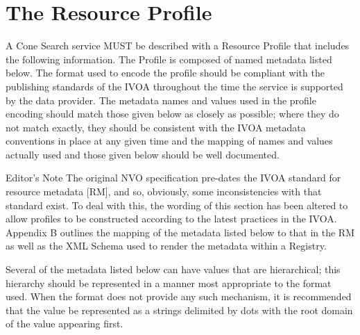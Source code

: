 \documentclass[11pt,a4paper]{ivoa}
\begin{document}
\section{The Resource Profile}
\label{sec:3}
A Cone Search service MUST be described with a Resource Profile that includes the following information. The Profile is composed of named metadata listed below. The format used to encode the profile should be compliant with the publishing standards of the IVOA throughout the time the service is supported by the data provider. The metadata names and values used in the profile encoding should match those given below as closely as possible; where they do not match exactly, they should be consistent with the IVOA metadata conventions in place at any given time and the mapping of names and values actually used and those given below should be well documented.
\begin{bigdescription}
\item[Editor's Note] The original NVO specification pre-dates the IVOA standard for resource metadata [RM], and so, obviously, some inconsistencies with that standard exist. To deal with this, the wording of this section has been altered to allow profiles to be constructed according to the latest practices in the IVOA. Appendix B outlines the mapping of the metadata listed below to that in the RM as well as the XML Schema used to render the metadata within a Registry.
\end{bigdescription}
Several of the metadata listed below can have values that are hierarchical; this hierarchy should be represented in a manner most appropriate to the format used. When the format does not provide any such mechanism, it is recommended that the value be represented as a strings delimited by dots with the root domain of the value appearing first.
\end{document}
